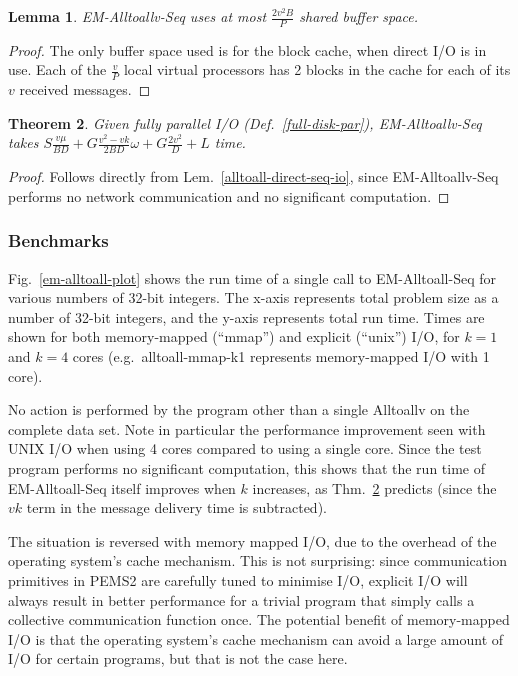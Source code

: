 \documentclass[12pt]{carletoncsthesis}
\newtheorem{thm}{Theorem}[section]
\newtheorem{lemma}[thm]{Lemma}
\begin{document}
\begin{lemma}
\label{alltoall-direct-seq-mem}
{\sc EM-Alltoallv-Seq} uses at most $\frac{2v^2B}{P}$ shared buffer space.
\end{lemma}
\begin{proof}
The only buffer space used is for the block cache, when direct I/O is in use.
Each of the $\frac{v}{P}$ local virtual processors has 2 blocks in the cache for each of
its $v$ received messages.
\end{proof}

\begin{thm}
\label{alltoall-direct-seq-time}
Given fully parallel I/O (Def.~\ref{full-disk-par}), {\sc EM-Alltoallv-Seq}
takes $S\frac{v\mu}{BD} + G\frac{v^2 - vk}{2BD}\omega + G\frac{2v^2}{D} +
L$ time.
\end{thm}
\begin{proof}
Follows directly from Lem.~\ref{alltoall-direct-seq-io}, since {\sc
EM-Alltoallv-Seq} performs no network communication and no significant
computation.
\end{proof}


\subsubsection{Benchmarks}


Fig.~\ref{em-alltoall-plot} shows the run time of a single call to {\sc
EM-Alltoall-Seq} for various numbers of 32-bit integers.  The x-axis represents
total problem size as a number of 32-bit integers, and the y-axis represents
total run time.  Times are shown for both memory-mapped (``mmap'') and explicit
(``unix'') I/O, for $k=1$ and $k=4$ cores (e.g.\ alltoall-mmap-k1 represents
memory-mapped I/O with 1 core).

No action is performed by the program other than a single {\sc Alltoallv}
on the complete data set.  Note in particular the performance improvement
seen with UNIX I/O when using 4 cores compared to using a single core.
Since the test program performs no significant computation, this shows that
the run time of {\sc EM-Alltoall-Seq} itself improves when $k$ increases,
as Thm.~\ref{alltoall-direct-seq-time} predicts (since the $vk$ term in the
message delivery time is subtracted).

The situation is reversed with memory mapped I/O, due to the overhead
of the operating system's cache mechanism.  This is not surprising: since
communication primitives in PEMS2 are carefully tuned to minimise I/O, explicit
I/O will always result in better performance for a trivial program that simply
calls a collective communication function once.  The potential benefit of
memory-mapped I/O is that the operating system's cache mechanism can avoid
a large amount of I/O for certain programs, but that is not the case here.
\end{document}
